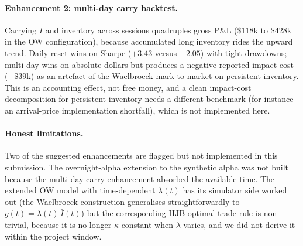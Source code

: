 \documentclass[11pt,a4paper]{article}
\begin{document}
\paragraph{Enhancement 2: multi-day carry backtest.}
Carrying $\bar I$ and inventory across sessions quadruples gross P\&L
($\$118$k to $\$428$k in the OW configuration), because accumulated
long inventory rides the upward trend.  Daily-reset wins on Sharpe
($+3.43$ versus $+2.05$) with tight drawdowns; multi-day wins on
absolute dollars but produces a negative reported impact cost
($-\$39$k) as an artefact of the Waelbroeck mark-to-market on persistent
inventory.  This is an accounting effect, not free money, and a clean
impact-cost decomposition for persistent inventory needs a different
benchmark (for instance an arrival-price implementation shortfall),
which is not implemented here.

\paragraph{Honest limitations.}
Two of the suggested enhancements are flagged but not implemented in
this submission.  The overnight-alpha extension to the synthetic alpha
was not built because the multi-day carry enhancement absorbed the
available time.  The extended OW model with time-dependent $\lambda(t)$
has its simulator side worked out (the Waelbroeck construction
generalises straightforwardly to $g(t) = \lambda(t)\,\bar I(t)$) but
the corresponding HJB-optimal trade rule is non-trivial, because it is
no longer $\kappa$-constant when $\lambda$ varies, and we did not
derive it within the project window.
\end{document}
